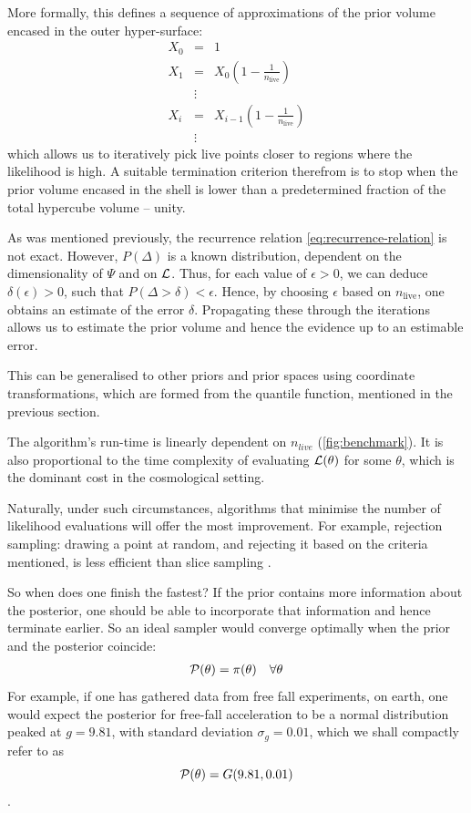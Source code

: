 \documentclass[usenatbib]{mnras}
\begin{document}
More formally, this defines a sequence of approximations of the
prior volume encased in the outer hyper-surface:
\begin{equation}
  \begin{array}{rcl}
  X_{0} &=  &1 \\
  X_{1} &= &X_{0} \left(1- \frac{1}{n_\text{live}}\right)\\
  & \vdots & \\
  X_{i} &= &X_{i-1}\left(1- \frac{1}{n_\text{live}}\right)\\
  & \vdots &
\end{array}
\label{eq:recurrence-relation}
\end{equation}
which allows us to iteratively pick live points closer to
regions where the likelihood is high. A suitable termination
criterion therefrom is to stop when the prior volume encased in the
shell is lower than a predetermined fraction of the total hypercube
volume -- unity.

As was mentioned previously, the recurrence relation
\eqref{eq:recurrence-relation} is not exact. However, \(P(\Delta)\) is
a known distribution, dependent on the dimensionality of \(\Psi\) and
on \({\cal L}\). Thus, for each value of \(\epsilon>0\), we can deduce
\(\delta(\epsilon) >0\), such that \(P(\Delta > \delta) <
   \epsilon\). Hence, by choosing \(\epsilon\) based on \(n_\text{live}\),
one obtains an estimate of the error \(\delta\). Propagating these
through the iterations allows us to estimate the prior volume and
hence the evidence up to an estimable error.

This can be generalised to other priors and prior spaces using
coordinate transformations, which are formed from the
quantile function, mentioned in the previous section.

The algorithm's run-time is linearly dependent on \(n_{live}\)
(\autoref{fig:benchmark}). It is also proportional to the time
complexity of evaluating \({\cal L}(\theta)\) for some \(\theta\),
which is the dominant cost in the cosmological setting.

Naturally, under such circumstances, algorithms that minimise the
number of likelihood evaluations will offer the most
improvement. For example, rejection sampling: drawing a point at
random, and rejecting it based on the criteria mentioned, is less
efficient than slice sampling \citep{Neal_2003}.

So when does one finish the fastest? If the prior contains more
information about the posterior, one should be able to incorporate
that information and hence terminate earlier.  So an ideal sampler
would converge optimally when the prior and the posterior coincide:
   \begin{equation}
\begin{array}{rl} {\cal P}(\theta) = \pi(\theta) & \forall \theta
   \end{array}
   \end{equation}
For example, if one has gathered data from free fall experiments,
on earth, one would expect the posterior for free-fall acceleration
to be a normal distribution peaked at \(g=9.81\), with standard
deviation \(\sigma_{g} = 0.01\), which we shall compactly refer to as
\[{\cal P}(\theta) = G(9.81, 0.01)\].
\end{document}
